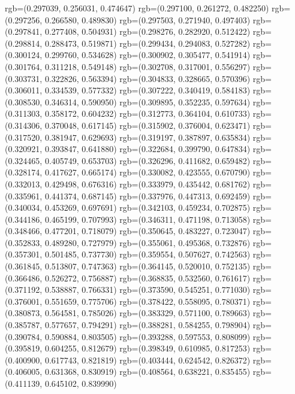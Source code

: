 {{{					rgb=(0.297039, 0.256031, 0.474647)
					rgb=(0.297100, 0.261272, 0.482250)
					rgb=(0.297256, 0.266580, 0.489830)
					rgb=(0.297503, 0.271940, 0.497403)
					rgb=(0.297841, 0.277408, 0.504931)
					rgb=(0.298276, 0.282920, 0.512422)
					rgb=(0.298814, 0.288473, 0.519871)
					rgb=(0.299434, 0.294083, 0.527282)
					rgb=(0.300124, 0.299760, 0.534628)
					rgb=(0.300902, 0.305477, 0.541914)
					rgb=(0.301764, 0.311218, 0.549148)
					rgb=(0.302708, 0.317001, 0.556297)
					rgb=(0.303731, 0.322826, 0.563394)
					rgb=(0.304833, 0.328665, 0.570396)
					rgb=(0.306011, 0.334539, 0.577332)
					rgb=(0.307222, 0.340419, 0.584183)
					rgb=(0.308530, 0.346314, 0.590950)
					rgb=(0.309895, 0.352235, 0.597634)
					rgb=(0.311303, 0.358172, 0.604232)
					rgb=(0.312773, 0.364104, 0.610733)
					rgb=(0.314306, 0.370048, 0.617145)
					rgb=(0.315902, 0.376004, 0.623471)
					rgb=(0.317520, 0.381947, 0.629693)
					rgb=(0.319197, 0.387897, 0.635834)
					rgb=(0.320921, 0.393847, 0.641880)
					rgb=(0.322684, 0.399790, 0.647834)
					rgb=(0.324465, 0.405749, 0.653703)
					rgb=(0.326296, 0.411682, 0.659482)
					rgb=(0.328174, 0.417627, 0.665174)
					rgb=(0.330082, 0.423555, 0.670790)
					rgb=(0.332013, 0.429498, 0.676316)
					rgb=(0.333979, 0.435442, 0.681762)
					rgb=(0.335961, 0.441374, 0.687145)
					rgb=(0.337976, 0.447313, 0.692459)
					rgb=(0.340034, 0.453269, 0.697691)
					rgb=(0.342103, 0.459234, 0.702875)
					rgb=(0.344186, 0.465199, 0.707993)
					rgb=(0.346311, 0.471198, 0.713058)
					rgb=(0.348466, 0.477201, 0.718079)
					rgb=(0.350645, 0.483227, 0.723047)
					rgb=(0.352833, 0.489280, 0.727979)
					rgb=(0.355061, 0.495368, 0.732876)
					rgb=(0.357301, 0.501485, 0.737730)
					rgb=(0.359554, 0.507627, 0.742563)
					rgb=(0.361845, 0.513807, 0.747363)
					rgb=(0.364145, 0.520010, 0.752135)
					rgb=(0.366486, 0.526272, 0.756887)
					rgb=(0.368835, 0.532560, 0.761617)
					rgb=(0.371192, 0.538887, 0.766331)
					rgb=(0.373590, 0.545251, 0.771030)
					rgb=(0.376001, 0.551659, 0.775706)
					rgb=(0.378422, 0.558095, 0.780371)
					rgb=(0.380873, 0.564581, 0.785026)
					rgb=(0.383329, 0.571100, 0.789663)
					rgb=(0.385787, 0.577657, 0.794291)
					rgb=(0.388281, 0.584255, 0.798904)
					rgb=(0.390784, 0.590884, 0.803505)
					rgb=(0.393288, 0.597553, 0.808099)
					rgb=(0.395819, 0.604255, 0.812679)
					rgb=(0.398349, 0.610985, 0.817253)
					rgb=(0.400900, 0.617743, 0.821819)
					rgb=(0.403444, 0.624542, 0.826372)
					rgb=(0.406005, 0.631368, 0.830919)
					rgb=(0.408564, 0.638221, 0.835455)
					rgb=(0.411139, 0.645102, 0.839990)
}}}
